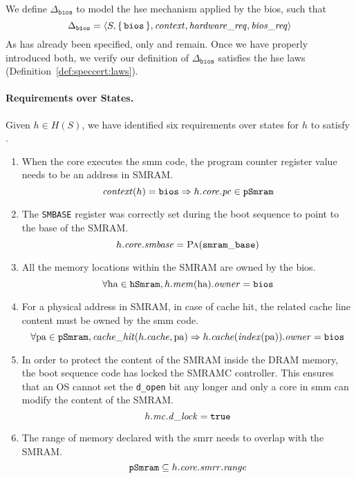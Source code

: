 
We define $\Delta_{\mathtt{bios}}$ to model the \ac{hse} mechanism applied by
the \ac{bios}, such that
\[
  \Delta_{\mathtt{bios}} = \langle S, \{\,\mathtt{bios}\,\},
  \mathit{context}, \mathit{hardware\_req}, \mathit{bios\_req} \rangle
\]
%
As  has already been specified, only  and
 remain.
%
Once we have properly introduced both, we verify our definition of
\( \Delta_{\mathtt{bios}} \) satisfies the \ac{hse} laws
(Definition~\ref{def:speccert:laws}).

\paragraph{Requirements over States.} 
%
Given \( h \in H(S) \), we have identified six requirements over states for
\( h \) to satisfy .
%
\begin{enumerate}
\item When the core executes the \ac{smm} code, the program counter register
  value needs to be an address in SMRAM.
  \[
    \mathit{context}(h) = \mathtt{bios} \Rightarrow h.\mathit{core}.\mathit{pc} \in
    \texttt{pSmram}
  \]
\item The \texttt{SMBASE} register was correctly set during the boot sequence to
  point to the base of the SMRAM.
  \[
    h.\mathit{core}.\mathit{smbase} = \textsc{Pa}(\mathtt{smram\_base})
  \]
\item All the memory locations within the SMRAM are owned by the \ac{bios}.
  \[
    \forall \mathrm{ha} \in \texttt{hSmram}, h.\mathit{mem}(\mathrm{ha}).\mathit{owner} =
    \mathtt{bios}
  \]
\item For a physical address in SMRAM, in case of cache hit, the related cache
  line content must be owned by the \ac{smm} code.
  \[
    \forall \mathrm{pa} \in \texttt{pSmram}, \mathit{cache\_hit}(h.\mathit{cache},
    \mathrm{pa}) \Rightarrow h.\mathit{cache}(\mathit{index}(\mathrm{pa})).\mathit{owner} =
    \mathtt{bios}
  \]
\item In order to protect the content of the SMRAM inside the DRAM memory, the
  boot sequence code has locked the SMRAMC controller.
  This ensures that an OS cannot set the \texttt{d\_open} bit any longer and
  only a core in \ac{smm} can modify the content of the SMRAM.
  \[
    h.\mathit{mc}.\mathit{d\_lock} = \mathtt{true}
  \]
\item The range of memory declared with the \ac{smrr} needs to overlap with the
  SMRAM.
  \[
    \texttt{pSmram} \subseteq h.\mathit{core}.\mathit{smrr}.\mathit{range}
  \]
\end{enumerate}

